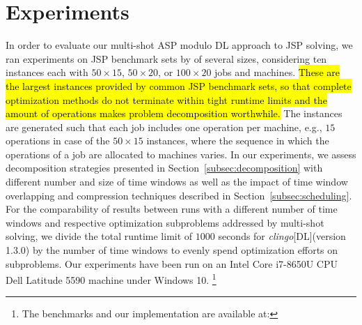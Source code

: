 \documentclass{tlp} %
\newcommand{\clingodl}{\emph{clingo}[DL]\xspace}
\begin{document}
\section{Experiments}\label{sec:experiments}
In order to evaluate our multi-shot ASP modulo DL approach to JSP solving,
we ran experiments on JSP benchmark sets by \cite{taillard1993benchmarks}
of several sizes,
considering ten instances each with
$50\times15$, $50\times20$, or $100\times20$ jobs and machines.
\hl{These are the largest instances provided by common JSP benchmark sets,
so that complete optimization methods do not terminate within tight runtime limits
and the amount of operations makes problem decomposition worthwhile.}
The instances are generated such that each job includes one operation per machine, e.g.,
$15$ operations in case of the $50\times15$ instances,
where the sequence in which the operations of a job are allocated to machines varies.
In our experiments, we assess decomposition strategies presented in Section~\ref{subsec:decomposition}
with different number and size of time windows as well as the impact of
time window overlapping and compression techniques described in Section~\ref{subsec:scheduling}.
For the comparability of results between runs with a different number of time windows
and respective optimization subproblems addressed by multi-shot solving,
we divide the total runtime limit of $1000$ seconds for \clingodl (version 1.3.0) by the number
of time windows to evenly spend optimization efforts on subproblems.
Our experiments have been run on an 
Intel\textsuperscript{\textregistered} Core\texttrademark{} i7-8650U CPU %
Dell Latitude 5590 machine under Windows 10.%
\footnote{The benchmarks and our implementation are available at: \myurl}

\end{document}
